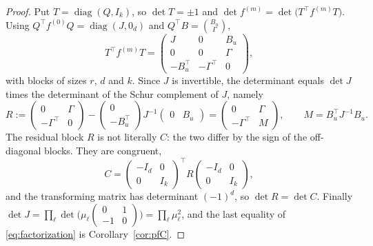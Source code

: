 \documentclass[12pt]{article}
\theoremstyle{plain}
\theoremstyle{definition}
\theoremstyle{remark}
\begin{document}
	\begin{proof}
		Put $T=\operatorname{diag}(Q,I_{k})$, so $\det T=\pm1$ and
		$\det f^{(m)}=\det\bigl(T^{\top}f^{(m)}T\bigr)$. Using
		$Q^{\top}f^{(0)}Q=\operatorname{diag}(J,0_{d})$ and
		$Q^{\top}B=\binom{B_{u}}{\Gamma}$,
		\begin{equation}
			T^{\top}f^{(m)}T
			=\begin{pmatrix}J&0&B_{u}\\ 0&0&\Gamma\\ -B_{u}^{\top}&-\Gamma^{\top}&0\end{pmatrix},
			\label{eq:congruent}
		\end{equation}
		with blocks of sizes $r$, $d$ and $k$. Since $J$ is invertible, the determinant
		equals $\det J$ times the determinant of the Schur complement of $J$, namely
		\[
		R:=\begin{pmatrix}0&\Gamma\\ -\Gamma^{\top}&0\end{pmatrix}
		-\begin{pmatrix}0\\ -B_{u}^{\top}\end{pmatrix}J^{-1}
		\begin{pmatrix}0&B_{u}\end{pmatrix}
		=\begin{pmatrix}0&\Gamma\\ -\Gamma^{\top}&M\end{pmatrix},
		\qquad M=B_{u}^{\top}J^{-1}B_{u}.
		\]
		The residual block $R$ is not literally $C$: the two differ by the sign of the
		off-diagonal blocks. They are congruent,
		\begin{equation}
			C=\begin{pmatrix}-I_{d}&0\\ 0&I_{k}\end{pmatrix}^{\!\top}
			R
			\begin{pmatrix}-I_{d}&0\\ 0&I_{k}\end{pmatrix},
			\label{eq:RtoC}
		\end{equation}
		and the transforming matrix has determinant $(-1)^{d}$, so $\det R=\det C$.
		Finally
		$\det J=\prod_{\ell}\det\bigl(\mu_{\ell}
		\left(\begin{smallmatrix}0&1\\-1&0\end{smallmatrix}\right)\bigr)
		=\prod_{\ell}\mu_{\ell}^{2}$, and the last equality of \eqref{eq:factorization}
		is Corollary~\ref{cor:pfC}.
	\end{proof}
	
\end{document}
